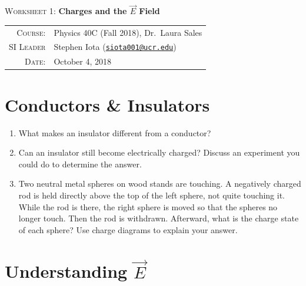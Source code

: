 \documentclass{article}
\newcommand{\email}[1]{\texttt{\href{mailto:#1}{#1}}}
\begin{document}
\begin{center}

\Large{\textsc{Worksheet 1}: \textbf{Charges and the $\vec{E}$ Field}}

\end{center}

\vspace{.5mm}


\begin{tabular}{rl}

\textsc{Course}:
&
Physics 40C (Fall 2018), Dr.~Laura Sales
\\
\textsc{SI Leader}
&
Stephen Iota (\email{siota001@ucr.edu})
\\
\textsc{Date}:
&
October 4, 2018
\end{tabular}



\section{Conductors \& Insulators}

\begin{enumerate}[label=(\alph*)]

	\item What makes an insulator different from a conductor?
	\item Can an insulator still become electrically charged? Discuss an experiment you could do to determine the answer. 
	\item Two neutral metal spheres on wood stands are touching. A negatively charged rod is held directly above the top of the left sphere, not quite touching it. While the rod is there, the right sphere is moved so that the spheres no longer touch. Then the rod is withdrawn. Afterward, what is the charge state of each sphere? Use charge diagrams to explain your answer.
	
\end{enumerate}


\section{Understanding $\vec{E}$}
\end{document}
